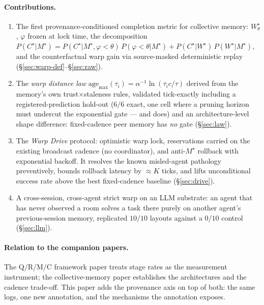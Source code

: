 \documentclass{article}
\newcommand{\wstar}{W^{\star}}
\newcommand{\mstar}{M^{\star}}
\newcommand{\cstar}{C^{\star}}
\begin{document}
\paragraph{Contributions.}
\begin{enumerate}[leftmargin=20pt,itemsep=2pt,topsep=2pt]
\item The first provenance-conditioned completion metric for
  collective memory: $\wstar_\theta$, $\varphi$ frozen at lock time,
  the decomposition
  $P(\cstar|\mstar)=P(\cstar|\mstar,\varphi{<}\theta)\,P(\varphi{<}\theta|\mstar)
  + P(\cstar|\wstar)\,P(\wstar|\mstar)$, and the counterfactual warp
  gain via source-masked deterministic replay
  (\S\ref{sec:warp-def}--\S\ref{sec:raw}).
\item The \emph{warp distance law}
  $\mathrm{age}_{\max}(\tau_i)=\alpha^{-1}\ln(\tau_i c/\tau)$ derived
  from the memory's own trust$\times$staleness rules, validated
  tick-exactly including a registered-prediction hold-out ($6/6$
  exact, one cell where a pruning horizon must undercut the
  exponential gate --- and does) and an architecture-level shape
  difference: fixed-cadence peer memory has \emph{no} gate
  (\S\ref{sec:law}).
\item The \emph{Warp Drive} protocol: optimistic warp lock,
  reservations carried on the existing broadcast cadence (no
  coordinator), and anti-$\mstar$ rollback with exponential backoff.
  It resolves the known misled-agent pathology preventively, bounds
  rollback latency by ${\approx}K$ ticks, and lifts unconditional
  success rate above the best fixed-cadence baseline
  (\S\ref{sec:drive}).
\item A cross-session, cross-agent strict warp on an LLM substrate:
  an agent that has never observed a room solves a task there purely
  on another agent's previous-session memory, replicated $10/10$
  layouts against a $0/10$ control (\S\ref{sec:llm}).
\end{enumerate}

\paragraph{Relation to the companion papers.}
The Q/R/M/C framework paper treats stage rates as the measurement
instrument; the collective-memory paper establishes the architectures
and the cadence trade-off. This paper adds the provenance axis on top
of both: the same logs, one new annotation, and the mechanisms the
annotation exposes. %
\end{document}
